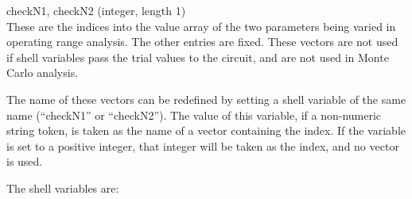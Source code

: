 \begin{description}
\item{\et checkN1, checkN2} (integer, length 1)\\
These are the indices into the {\et value} array of the two parameters being
varied in operating range analysis.  The other entries are fixed. 
These vectors are not used if shell variables pass the trial values to
the circuit, and are not used in Monte Carlo analysis.

The name of these vectors can be redefined by setting a shell variable
of the same name (``checkN1'' or ``checkN2'').  The value of this
variable, if a non-numeric string token, is taken as the name of a
vector containing the index.  If the variable is set to a positive
integer, that integer will be taken as the index, and no vector is
used.

\end{description}

The shell variables are:


